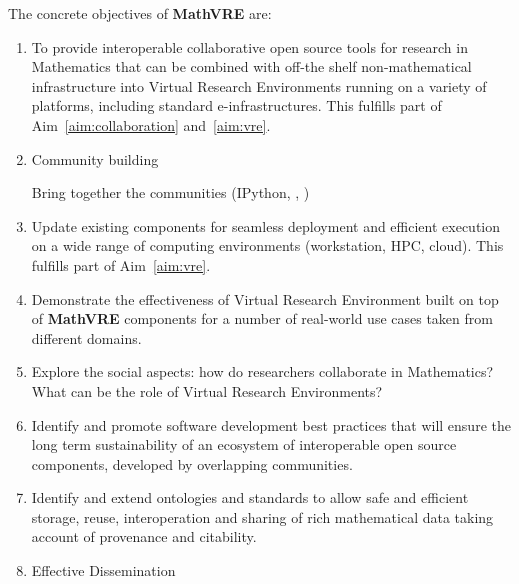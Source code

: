 \documentclass[a4paper,11pt]{article}
\newcommand{\XX}{\textbf{MathVRE}\xspace}
\newcommand{\TheProject}{\XX}
\begin{document}
The concrete objectives of \TheProject are:
\begin{enumerate}
\item\label{objectives:tools} To provide interoperable collaborative
  open source tools for research in Mathematics that can be combined
  with off-the shelf non-mathematical infrastructure 
  into Virtual Research Environments running on a variety of
  platforms, including standard e-infrastructures. This fulfills part of
  Aim~\ref{aim:collaboration} and~\ref{aim:vre}.



\item Community building

  Bring together the communities (IPython, \Sage, \Singular)
\item Update existing components for seamless deployment and efficient
  execution on a wide range of computing environments (workstation,
  HPC, cloud). This fulfills part of Aim~\ref{aim:vre}.

\item Demonstrate the effectiveness of Virtual Research Environment
  built on top of \TheProject components for a number of real-world
  use cases taken from different domains.
\item Explore the social aspects: how do researchers collaborate in
  Mathematics? What can be the role of Virtual Research Environments?
\item Identify and promote software development best practices that will
  ensure the long term sustainability of an ecosystem of interoperable
  open source components,  developed by overlapping communities.

\item {} Identify and extend ontologies and standards to
  allow safe and efficient storage, reuse, interoperation and sharing of rich mathematical
  data taking account of provenance and citability.

\item Effective Dissemination
\end{enumerate}
\end{document}
